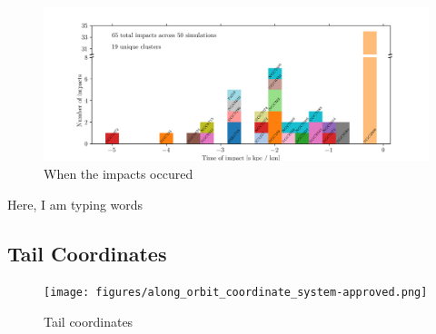 \documentclass[]{aa}
\begin{document}
  \begin{figure}
    \centering
    \includegraphics[width=\linewidth]{histogram_impact_time.png}
    \caption{When the impacts occured}
    \label{fig:histogram_impact_time}
  \end{figure}
  


  Here, I am typing words





\begin{appendix}

  \section{Tail Coordinates} \label{appendix:TailCoordinates}

  \begin{figure}
    \centering
    \texttt{[image: figures/along\_orbit\_coordinate\_system-approved.png]}
    \caption{Tail coordinates}
    \label{fig:TailCoordinates}
  \end{figure}



\end{appendix}
\end{document}
